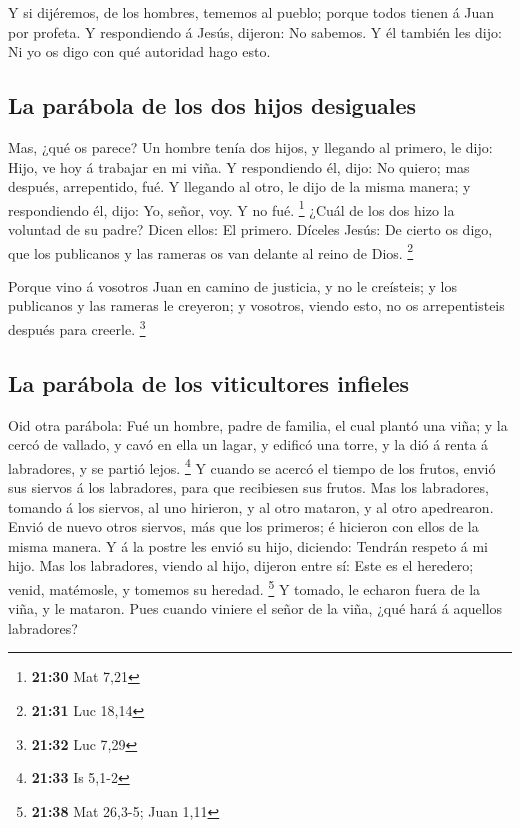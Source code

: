  Y si dijéremos, de los hombres, tememos al pueblo; porque
todos tienen á Juan por profeta.  Y respondiendo á Jesús,
dijeron: No sabemos. Y él también les dijo: Ni yo os digo con qué
autoridad hago esto.

\hypertarget{la-paruxe1bola-de-los-dos-hijos-desiguales}{%
\subsection{La parábola de los dos hijos
desiguales}\label{la-paruxe1bola-de-los-dos-hijos-desiguales}}

 Mas, ¿qué os parece? Un hombre tenía dos hijos, y llegando
al primero, le dijo: Hijo, ve hoy á trabajar en mi viña.  Y
respondiendo él, dijo: No quiero; mas después, arrepentido, fué.
 Y llegando al otro, le dijo de la misma manera; y
respondiendo él, dijo: Yo, señor, voy. Y no fué. \footnote{\textbf{21:30}
  Mat 7,21}  ¿Cuál de los dos hizo la voluntad de su padre?
Dicen ellos: El primero. Díceles Jesús: De cierto os digo, que los
publicanos y las rameras os van delante al reino de Dios. \footnote{\textbf{21:31}
  Luc 18,14}

 Porque vino á vosotros Juan en camino de justicia, y no le
creísteis; y los publicanos y las rameras le creyeron; y vosotros,
viendo esto, no os arrepentisteis después para creerle. \footnote{\textbf{21:32}
  Luc 7,29}

\hypertarget{la-paruxe1bola-de-los-viticultores-infieles}{%
\subsection{La parábola de los viticultores
infieles}\label{la-paruxe1bola-de-los-viticultores-infieles}}

 Oid otra parábola: Fué un hombre, padre de familia, el
cual plantó una viña; y la cercó de vallado, y cavó en ella un lagar, y
edificó una torre, y la dió á renta á labradores, y se partió lejos.
\footnote{\textbf{21:33} Is 5,1-2}  Y cuando se acercó el
tiempo de los frutos, envió sus siervos á los labradores, para que
recibiesen sus frutos.  Mas los labradores, tomando á los
siervos, al uno hirieron, y al otro mataron, y al otro apedrearon.
 Envió de nuevo otros siervos, más que los primeros; é
hicieron con ellos de la misma manera.  Y á la postre les
envió su hijo, diciendo: Tendrán respeto á mi hijo.  Mas
los labradores, viendo al hijo, dijeron entre sí: Este es el heredero;
venid, matémosle, y tomemos su heredad. \footnote{\textbf{21:38} Mat
  26,3-5; Juan 1,11}  Y tomado, le echaron fuera de la
viña, y le mataron.  Pues cuando viniere el señor de la
viña, ¿qué hará á aquellos labradores?

